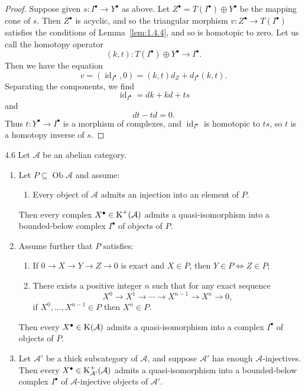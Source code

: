 \begin{proof}
Suppose given $s\colon I^\bullet\to Y^\bullet$ as above. Let $Z^\bullet = T(I^\bullet)\oplus Y^\bullet$ be the mapping cone of $s$. Then $Z^\bullet$ is acyclic, and so the triangular morphism $v\colon Z^\bullet\to T(I^\bullet)$ satisfies the conditions of Lemma~\ref{lem:1.4.4}, and so is homotopic to zero. Let us call the homotopy operator
\[
(k,t)\colon T(I^\bullet)\oplus Y^\bullet \longrightarrow I^\bullet.
\]
Then we have the equation
\[
v = (\operatorname{id}_{I^\bullet},0) = (k,t)d_Z + d_{I^\bullet}(k,t).
\]
Separating the components, we find
\[
\operatorname{id}_{I^\bullet} = dk + kd + ts
\]
and
\[
dt - td = 0.
\]
Thus $t\colon Y^\bullet\to I^\bullet$ is a morphism of complexes, and $\operatorname{id}_{I^\bullet}$ is homotopic to $ts$, so $t$ is a homotopy inverse of $s$.
\end{proof}

\begin{booklemma}{4.6}\label{lem:1.4.6}
Let $\mathcal{A}$ be an abelian category.
\begin{enumerate}
\item[1)] Let $P\subseteq\operatorname{Ob}\mathcal{A}$ and assume:
\begin{enumerate}
\item[(i)] Every object of $\mathcal{A}$ admits an injection into an element of $P$.
\end{enumerate}
Then every complex $X^\bullet\in\operatorname{K}^+(\mathcal{A})$ admits a quasi-isomorphism into a bounded-below complex $I^\bullet$ of objects of $P$.

\item[2)] Assume further that $P$ satisfies:
\begin{enumerate}
\item[(ii)] If $0\to X\to Y\to Z\to 0$ is exact and $X\in P$, then $Y\in P\iff Z\in P$;
\item[(iii)] There exists a positive integer $n$ such that for any exact sequence
\[
X^0\to X^1\to\cdots\to X^{n-1}\to X^n\to 0,
\]
if $X^0,\dots,X^{n-1}\in P$ then $X^n\in P$.
\end{enumerate}
Then every $X^\bullet\in\operatorname{K}(\mathcal{A})$ admits a quasi-isomorphism into a complex $I^\bullet$ of objects of $P$.

\item[3)] Let $\mathcal{A}'$ be a thick subcategory of $\mathcal{A}$, and suppose $\mathcal{A}'$ has enough $\mathcal{A}$-injectives. Then every $X^\bullet\in\operatorname{K}_{\mathcal{A}'}^+(\mathcal{A})$ admits a quasi-isomorphism into a bounded-below complex $I^\bullet$ of $\mathcal{A}$-injective objects of $\mathcal{A}'$.
\end{enumerate}
\end{booklemma}

